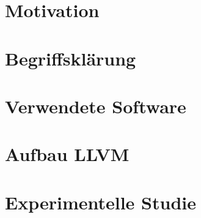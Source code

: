 \documentclass[a4paper, ngerman]{scrreprt}
\begin{document}


\tableofcontents

\chapter{Motivation}


\chapter{Begriffsklärung}


\chapter{Verwendete Software}


\chapter{Aufbau LLVM}


\chapter{Experimentelle Studie}
\end{document}
